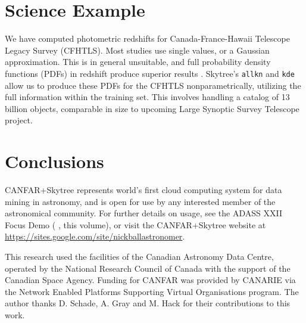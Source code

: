 \section{Science Example} \label{Sec: Science Example}

We have computed photometric redshifts for Canada-France-Hawaii Telescope Legacy Survey (CFHTLS). Most studies use single values, or a Gaussian approximation. This is in general unsuitable, and full probability density functions (PDFs) in redshift produce superior results \citep{ball:pdfphotoz}. Skytree's {\tt allkn} and {\tt kde} allow us to produce these PDFs for the CFHTLS nonparametrically, utilizing the full information within the training set. This involves handling a catalog of 13 billion objects, comparable in size to upcoming Large Synoptic Survey Telescope project.

\section{Conclusions}

CANFAR+Skytree represents world's first cloud computing system for data mining in astronomy, and is open for use by any interested member of the astronomical community. For further details on usage, see the ADASS XXII Focus Demo (\citeauthor{ball:adass12focusdemo} \citeyear{ball:adass12focusdemo}, this volume), or visit the CANFAR+Skytree website at \url{https://sites.google.com/site/nickballastronomer}.

\acknowledgements This research used the facilities of the Canadian Astronomy Data Centre, operated by the National Research Council of Canada with the support of the Canadian Space Agency. Funding for CANFAR was provided by CANARIE via the Network Enabled Platforms Supporting Virtual Organisations program. The author thanks D. Schade, A. Gray and M. Hack for their contributions to this work.



